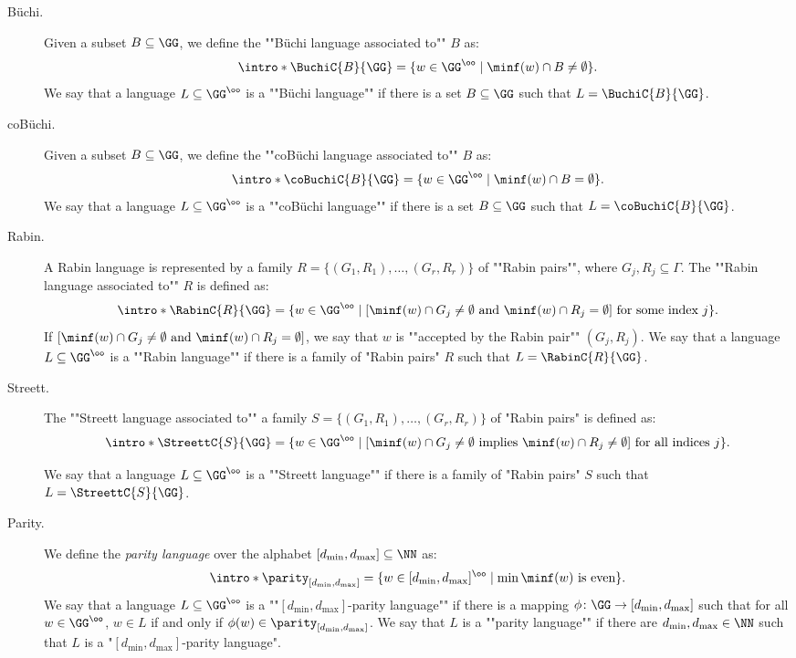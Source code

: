 \documentclass{theoretics}
\begin{document}
\begin{description}	
	\item[Büchi.] \AP Given a subset $B\subseteq \GG$, we define the ""Büchi language associated to"" $B$ as:
	\[ \intro*\BuchiC{B}{\GG}  = \{w\in \GG^\oo \mid \minf(w) \cap B \neq \emptyset\}. \]
	\AP We say that a language $L\subseteq \GG^\oo$ is a ""B\"uchi language"" if there is a set $B\subseteq \GG$ such that $L = \BuchiC{B}{\GG}$.
	
	
	
	\item[coB\"uchi.] \AP Given a subset $B\subseteq \GG$, we define the ""coB\"uchi language associated to"" $B$ as:
	\[ \intro*\coBuchiC{B}{\GG}  = \{w\in \GG^\oo \mid \minf(w) \cap B = \emptyset\}. \]
	\AP We say that a language $L\subseteq \GG^\oo$ is a ""coB\"uchi language"" if there is a set $B\subseteq \GG$ such that $L = \coBuchiC{B}{\GG}$.
	
	\item[Rabin.] \AP A Rabin language is represented by a family $R=\{(G_1,R_1),\dots,(G_r,R_r)\}$  of ""Rabin pairs"", where $G_j,R_j\subseteq \Gamma$.
	The ""Rabin language associated to"" $R$ is defined as:
	\[ \intro*\RabinC{R}{\GG} = \{w\in \GG^\oo \mid [\minf(w)\cap G_j \neq \emptyset \text{ and } \minf(w)\cap R_j = \emptyset] \text{ for some index } j \}. \]
	\AP If $[\minf(w)\cap G_j \neq \emptyset \text{ and } \minf(w)\cap R_j = \emptyset]$, we say that $w$ is ""accepted by the Rabin pair"" $(G_j, R_j)$.
	\AP We say that a language $L\subseteq \GG^\oo$ is a ""Rabin language"" if there is a family of "Rabin pairs" $R$ such that $L = \RabinC{R}{\GG}$.
	
	
	\item[Streett.] \AP The ""Streett language associated to"" a family  $S=\{(G_1,R_1),\dots,(G_r,R_r)\}$ of "Rabin pairs" is defined as:
	\[ \intro*\StreettC{S}{\GG} = \{w\in \GG^\oo \mid [\minf(w)\cap G_j \neq \emptyset \text{ implies } \minf(w)\cap R_j \neq \emptyset] \text{ for all indices } j \}. \]
	
	\AP We say that a language $L\subseteq \GG^\oo$ is a ""Streett language"" if there is a family of "Rabin pairs" $S$ such that $L = \StreettC{S}{\GG}$.
	
	\item[Parity.] \AP We define the \emph{parity language} over the alphabet $[d_{\min}, d_{\max}]\subseteq \NN$ %
	 as:
	\[ \intro*\parity_{[d_{\min}, d_{\max}]} = \{ w\in [d_{\min}, d_{\max}]^\oo \mid \min \minf(w) \text{ is even}\}.\]
	\AP We say that a language $L\subseteq \GG^\oo$ is a ""$[d_{\min}, d_{\max}]$-parity language"" if there is a mapping $\phi\colon \GG \to [d_{\min}, d_{\max}]$ such that for all $w\in \GG^\oo$, $w\in L$ if and only if $\phi(w)\in \parity_{[d_{\min}, d_{\max}]}$. We say that $L$ is a ""parity language"" if there are $d_{\min}, d_{\max}\in \NN$ such that $L$ is a "$[d_{\min}, d_{\max}]$-parity language".


\end{description}
\end{document}

